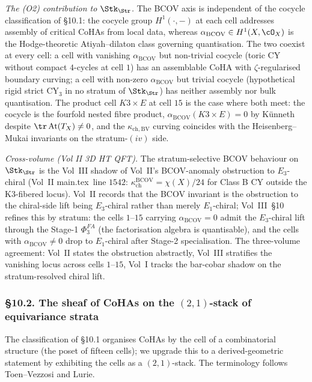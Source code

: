 \emph{The (O2) contribution to $\Stk_{\Str}$.} The BCOV axis is
independent of the cocycle classification of \S 10.1: the cocycle
group $H^{1}(\cdot,-)$ at each cell addresses assembly of critical
CoHAs from local data, whereas $\alpha_{\mathrm{BCOV}}\in
H^{1}(X,\cO_X)$ is the Hodge-theoretic Atiyah--dilaton class
governing quantisation. The two coexist at every cell: a cell with
vanishing $\alpha_{\mathrm{BCOV}}$ but non-trivial cocycle (toric
CY without compact $4$-cycles at cell $1$) has an assemblable CoHA
with $\zeta$-regularised boundary curving; a cell with non-zero
$\alpha_{\mathrm{BCOV}}$ but trivial cocycle (hypothetical rigid
strict CY$_3$ in no stratum of $\Stk_{\Str}$) has neither assembly
nor bulk quantisation. The product cell $K3\times E$ at cell $15$
is the case where both meet: the cocycle is the fourfold nested
fibre product, $\alpha_{\mathrm{BCOV}}(K3\times E)=0$ by Künneth
despite $\tr\,\mathrm{At}(T_X)\neq 0$, and the
$\kappa_{\mathrm{ch,BV}}$ curving coincides with the
Heisenberg--Mukai invariants on the stratum-$(iv)$ side.

\emph{Cross-volume (Vol II 3D HT QFT).} The stratum-selective BCOV
behaviour on $\Stk_{\Str}$ is the Vol~III shadow of Vol~II's
BCOV-anomaly obstruction to $E_{3}$-chiral (Vol~II main.tex~line
$1542$: $\kappa_{\mathrm{ch}}^{\mathrm{BCOV}}=\chi(X)/24$ for Class B CY outside
the K3-fibered locus). Vol~II records that the BCOV invariant is the
obstruction to the chiral-side lift being $E_{3}$-chiral rather than
merely $E_{1}$-chiral; Vol~III~\S 10 refines this by stratum: the
cells $1$--$15$ carrying $\alpha_{\mathrm{BCOV}} = 0$ admit the
$E_{3}$-chiral lift through the Stage-1 $\Phi^{FA}_{3}$ (the
factorisation algebra is quantisable), and the cells with
$\alpha_{\mathrm{BCOV}} \neq 0$ drop to $E_{1}$-chiral after
Stage-2 specialisation. The three-volume agreement: Vol~II states
the obstruction abstractly, Vol~III stratifies the vanishing locus
across cells $1$--$15$, Vol~I tracks the bar-cobar shadow on the
stratum-resolved chiral lift.

\subsubsection{\S 10.2. The sheaf of CoHAs on the $(2,1)$-stack of
equivariance strata}
\label{gluing:sec:10-2-sheaf-on-stack}

The classification of \S 10.1 organises CoHAs by the cell of a
combinatorial structure (the poset of fifteen cells); we upgrade this
to a derived-geometric statement by exhibiting the cells as a
$(2,1)$-stack. The terminology follows Toen--Vezzosi and Lurie.

